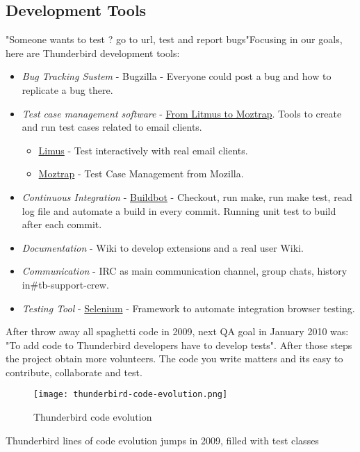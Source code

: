 \subsection{Development Tools} "Someone wants to test ? go to url, test and report bugs"Focusing in our goals, here are Thunderbird development tools:
\begin{itemize}
	\item \textit{Bug Tracking Sustem} - Bugzilla - Everyone could post a bug and how to replicate a bug there.
	\item \textit{Test case management software} - \href{https://mail.mozilla.org/pipermail/thunderbird-testers/2012-October/000111.html}{From Litmus to Moztrap}. Tools to create and run test cases related to email clients.
\begin{itemize}
	\item \href{http://litmus.com/}{Limus} - Test interactively with real email clients.
	\item \href{http://moztrap.wordpress.com/}{Moztrap} - Test Case Management from Mozilla.
\end{itemize}
	\item \textit{Continuous Integration} - \href{http://trac.buildbot.net/}{Buildbot} - Checkout, run make, run make test, read log file and automate a build in every commit. Running unit test to build after each commit.
	\item \textit{Documentation} - Wiki to develop extensions and a real user Wiki.
	\item \textit{Communication} - IRC as main communication channel, group chats, history in\#tb-support-crew.
	\item \textit{Testing Tool} - \href{http://docs.seleniumhq.org/}{Selenium} - Framework to automate integration browser testing.
\end{itemize} After throw away all spaghetti code in 2009, next QA goal in January 2010 was: "To add code to Thunderbird developers have to develop tests". After those steps the project obtain more volunteers. The code you write matters and its easy to contribute, collaborate and test.

\begin{figure}[H]
\centering
\texttt{[image: thunderbird-code-evolution.png]}
\caption{Thunderbird code evolution}
\label{}
\end{figure}

Thunderbird lines of code evolution jumps in 2009, filled with test classes

